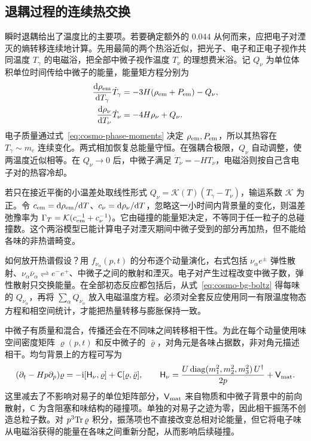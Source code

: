 \subsection{退耦过程的连续热交换}

瞬时退耦给出了温度比的主要项。若要确定额外的 $0.044$ 从何而来，应把电子对湮灭的熵转移连续地计算。先用最简的两个热浴近似，把光子、电子和正电子视作共同温度 $T_\gamma$ 的电磁浴，把全部中微子视作温度 $T_\nu$ 的理想费米浴。记 $Q_\nu$ 为单位体积单位时间传给中微子的能量，能量矩方程分别为
\[
 \begin{aligned}
 \frac{\dd\rho_{\rm em}}{\dd T_\gamma}\dot T_\gamma
 &=-3H(\rho_{\rm em}+P_{\rm em})-Q_\nu,\\
 \frac{\dd\rho_\nu}{\dd T_\nu}\dot T_\nu
 &=-4H\rho_\nu+Q_\nu .
 \end{aligned}
\]
电子质量通过式~\eqref{eq:cosmo-phase-moments} 决定 $\rho_{\rm em},P_{\rm em}$，所以其热容在 $T_\gamma\sim m_e$ 连续变化。两式相加恢复总能量守恒。在强耦合极限，$Q_\nu$ 自动调整，使两温度近似相等。在 $Q_\nu\to0$ 后，中微子满足 $\dot T_\nu=-HT_\nu$，电磁浴则按自己含电子对的热容冷却。

若只在接近平衡的小温差处取线性形式 $Q_\nu=\mathcal K(T)(T_\gamma-T_\nu)$，输运系数 $\mathcal K$ 为正。令 $c_{\rm em}=\dd\rho_{\rm em}/\dd T$、$c_\nu=\dd\rho_\nu/\dd T$，忽略这一小时间内背景量的变化，则温差弛豫率为 $\Gamma_T=\mathcal K(c_{\rm em}^{-1}+c_\nu^{-1})$。它由碰撞的能量矩决定，不等同于任一粒子的总碰撞数。这个两浴模型已能计算电子对湮灭期间中微子受到的部分再加热，但不能给各味的非热谱畸变。

如何放开热谱假设？用 $f_{\nu_\alpha}(p,t)$ 的分布逐个动量演化，右式包括 $\nu_\alpha e^\pm$ 弹性散射、$\nu_\alpha\bar\nu_\alpha\rightleftharpoons e^-e^+$、中微子之间的散射和湮灭。电子对产生过程改变中微子数，弹性散射只交换能量。在全部初态反应都包括后，从式~\eqref{eq:cosmo-bg-boltz} 得每味的 $Q_{\nu_\alpha}$，再将 $\sum_\alpha Q_{\nu_\alpha}$ 放入电磁温度方程。必须对全套反应使用同一有限温度物态方程和相空间统计，才能把热量转移与膨胀保持一致。

中微子有质量和混合，传播还会在不同味之间转移相干性。为此在每个动量使用味空间密度矩阵 $\varrho(p,t)$ 和反中微子的 $\bar\varrho$，对角元是各味占据数，非对角元描述相干。均匀背景上的方程可写为
\[
 (\partial_t-Hp\partial_p)\varrho
 =-\mathrm i[\mathsf H_\nu,\varrho]+\mathsf C[\varrho,\bar\varrho],\qquad
 \mathsf H_\nu=\frac{U\,{\rm diag}(m_1^2,m_2^2,m_3^2)\,U^\dagger}{2p}
                  +\mathsf V_{\rm mat}.
\]
这里减去了不影响对易子的单位矩阵部分，$\mathsf V_{\rm mat}$ 来自物质和中微子背景中的前向散射，$\mathsf C$ 为含阻塞和味结构的碰撞项。单独的对易子之迹为零，因此相干振荡不创造总粒子数。对 $p^3{\rm Tr}\,\varrho$ 积分，振荡项也不直接改变总相对论能量，但它将电子味从电磁浴获得的能量在各味之间重新分配，从而影响后续碰撞。


